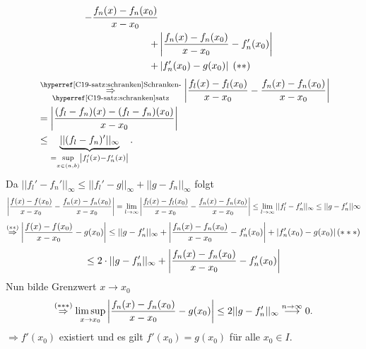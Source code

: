 \documentclass[../ana1.tex]{subfiles}
\begin{document}
\begin{bew}
\begin{align*}
{        - \frac{f_n(x)-f_n(x_0)}{x-x_0} } \\
        + &\left| \frac{f_n(x)-f_n(x_0)}{x-x_0} 
        - f_n'(x_0) \right| \\
        + &\left| f_n'(x_0)
        - g(x_0) \right| \; (**)
    \end{align*}
    \begin{align*}
        &\overunderref{C19-satz:schranken}{Schranken-}{satz}{\Rightarrow}
        \abs{\frac{f_l(x)-f_l(x_0)}{x-x_0}-\frac{f_n(x)-f_n(x_0)}{x-x_0}} \\
        &= \abs{\frac{(f_l-f_n)(x)-(f_l - f_n)(x_0)}{x-x_0}} \\
        &\leq \underbrace{||(f_l-f_n)'||_\infty}_
        {=\underset{x \in (a,b)}{\sup} \abs{f_l'(x)-f_n'(x)}}.
    \end{align*}
    Da \( ||f_l' - f_n'||_\infty \leq ||f_l' - g||_\infty 
    + ||g - f_n||_\infty \) folgt 
    \[ \left| \frac{ f(x) - f(x_0) }{ x-x_0 } 
    - \frac{ f_n(x) - f_n(x_0) }{ x-x_0 } \right| 
    = \lim\limits_{l\rightarrow\infty} \left| \frac{ f_l(x) - f_l(x_0) }{ x-x_0 } 
    - \frac{ f_n(x) - f_n(x_0) }{ x-x_0 } \right| 
    \leq \lim\limits_{l\rightarrow\infty} ||f_l' - f_n'||_\infty \leq ||g-f_n'||\infty \]
    \[ \overset{(**)}{\Rightarrow} \left| \frac{ f(x) - f(x_0) }{ x-x_0 } 
    - g(x_0) \right| 
    \leq ||g - f_n' ||_\infty 
    + \left| \frac{ f_n(x) - f_n(x_0) }{ x-x_0 } - f_n'(x_0) \right| 
    + \left| f_n'(x_0) - g(x_0) \right| (***) \]
    \[ \leq 2\cdot ||g - f_n' ||_\infty 
    + \left| \frac{ f_n(x) - f_n(x_0) }{ x-x_0 } - f_n'(x_0) \right|  \]
    Nun bilde Grenzwert \( x \rightarrow x_0 \)
    \[ \overset{(***)}{\Rightarrow} 
    \limsup\limits_{x\rightarrow x_0} 
    \left| \frac{ f_n(x) - f_n(x_0) }{ x-x_0 } - g(x_0) \right| 
    \leq 2 ||g - f_n'||_\infty 
    \overset{n\rightarrow \infty}{\longrightarrow} 0. \]
    \( \Rightarrow f'(x_0) \) existiert und es gilt 
    \( f'(x_0) = g(x_0) \) für alle \( x_0 \in I \).
\end{bew}
\end{document}
